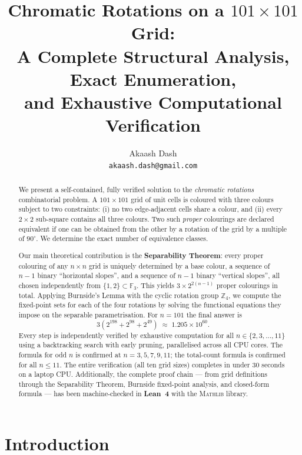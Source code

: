 \documentclass{article}
\title{Chromatic Rotations on a $101 \times 101$ Grid:\\
A Complete Structural Analysis, Exact Enumeration,\\
and Exhaustive Computational Verification}
\author{%
  Akaash Dash \\
  \texttt{akaash.dash@gmail.com}
}
\begin{document}
\maketitle

\begin{abstract}
We present a self-contained, fully verified solution to the
\emph{chromatic rotations} combinatorial problem.
A $101\times 101$ grid of unit cells is coloured with three
colours subject to two constraints: (i) no two
edge-adjacent cells share a colour, and (ii) every $2\times 2$
sub-square contains all three colours.
Two such \emph{proper} colourings are declared equivalent
if one can be obtained from the other by a rotation of the
grid by a multiple of $90^\circ$.
We determine the exact number of equivalence classes.

Our main theoretical contribution is the
\textbf{Separability Theorem}: every proper colouring of any
$n\times n$ grid is uniquely determined by a base colour, a
sequence of $n-1$ binary ``horizontal slopes'', and a sequence
of $n-1$ binary ``vertical slopes'', all chosen independently
from $\{1,2\}\subset\mathbb{F}_3$.
This yields $3\times 2^{2(n-1)}$ proper colourings in total.
Applying Burnside's Lemma with the cyclic rotation group
$\mathbb{Z}_4$, we compute the fixed-point sets for each of
the four rotations by solving the functional equations they
impose on the separable parametrisation.
For $n = 101$ the final answer is
\[
  \boxed{3\!\left(2^{198}+2^{98}+2^{49}\right)
  \;\approx\; 1.205\times 10^{60}.}
\]
Every step is independently verified by exhaustive computation
for all $n\in\{2,3,\ldots,11\}$ using a backtracking search
with early pruning, parallelised across all CPU cores.
The formula for odd $n$ is confirmed at $n=3,5,7,9,11$; the
total-count formula is confirmed for all $n\leq 11$.
The entire verification (all ten grid sizes) completes in
under 30 seconds on a laptop CPU.
Additionally, the complete proof chain --- from grid
definitions through the Separability Theorem, Burnside
fixed-point analysis, and closed-form formula --- has been
machine-checked in \textbf{Lean~4} with the
\textsc{Mathlib} library.
\end{abstract}

\section{Introduction}
\label{sec:intro}
\end{document}
